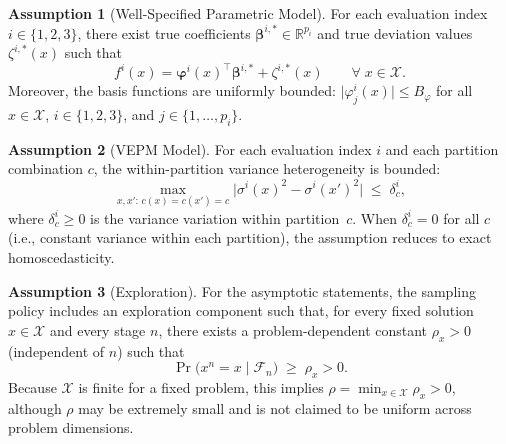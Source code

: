 \documentclass[12pt]{article}
\theoremstyle{plain}
\theoremstyle{definition}
\newtheorem{assumption}{Assumption}[section]
\theoremstyle{remark}
\begin{document}
\begin{assumption}[Well-Specified Parametric Model]\label{asm:parametric}
For each evaluation index $i\in\{1,2,3\}$, there exist true coefficients
$\boldsymbol{\beta}^{i,*}\in\mathbb{R}^{p_{i}}$ and true deviation
values $\zeta^{i,*}(x)$ such that
\[
  f^{i}(x) = \boldsymbol{\varphi}^{i}(x)^{\!\top}
              \boldsymbol{\beta}^{i,*} + \zeta^{i,*}(x)
  \qquad\forall\; x\in\mathcal{X}.
\]
Moreover, the basis functions are uniformly bounded:
$\lvert\varphi^{i}_{j}(x)\rvert \le B_{\varphi}$ for all
$x\in\mathcal{X}$, $i\in\{1,2,3\}$, and $j\in\{1,\dots,p_{i}\}$.
\end{assumption}

\begin{assumption}[VEPM Model]\label{asm:vepm}
For each evaluation index $i$ and each partition combination $c$, the
within-partition variance heterogeneity is bounded:
\[
  \max_{x,x':\, c(x)=c(x')=c} \bigl|\sigma^{i}(x)^{2} - \sigma^{i}(x')^{2}\bigr|
  \;\le\; \delta_{c}^{i},
\]
where $\delta_{c}^{i} \ge 0$ is the variance variation within partition~$c$.
When $\delta_{c}^{i} = 0$ for all $c$ (i.e., constant variance within each partition),
the assumption reduces to exact homoscedasticity.
\end{assumption}

\begin{assumption}[Exploration]\label{asm:exploration}
For the asymptotic statements, the sampling policy includes an exploration
component such that, for every fixed solution $x\in\mathcal{X}$ and every
stage $n$, there exists a problem-dependent constant $\rho_x>0$
(independent of $n$) such that
\[
  \Pr\!\bigl(x^{n}=x\mid \mathcal{F}_n\bigr) \;\ge\; \rho_x > 0.
\]
Because $\mathcal{X}$ is finite for a fixed problem, this implies
$\rho=\min_{x\in\mathcal{X}}\rho_x>0$, although $\rho$ may be extremely
small and is not claimed to be uniform across problem dimensions.
\end{assumption}
\end{document}
